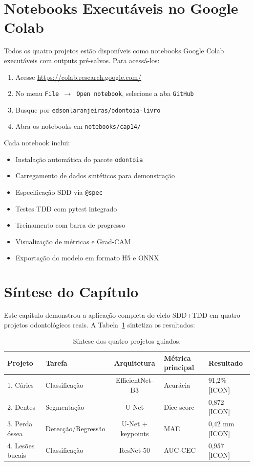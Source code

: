 \section{Notebooks Executáveis no Google Colab}

Todos os quatro projetos estão disponíveis como notebooks Google Colab
executáveis com outputs pré-salvos. Para acessá-los:

\begin{enumerate}
  \item Acesse \url{https://colab.research.google.com/}
  \item No menu \texttt{File $\rightarrow$ Open notebook}, selecione a aba \texttt{GitHub}
  \item Busque por \texttt{edsonlaranjeiras/odontoia-livro}
  \item Abra os notebooks em \texttt{notebooks/cap14/}
\end{enumerate}

Cada notebook inclui:

\begin{itemize}
  \item Instalação automática do pacote \texttt{odontoia}
  \item Carregamento de dados sintéticos para demonstração
  \item Especificação SDD via \texttt{@spec}
  \item Testes TDD com pytest integrado
  \item Treinamento com barra de progresso
  \item Visualização de métricas e Grad-CAM
  \item Exportação do modelo em formato H5 e ONNX
\end{itemize}

\section{Síntese do Capítulo}

Este capítulo demonstrou a aplicação completa do ciclo SDD+TDD em quatro
projetos odontológicos reais. A Tabela~\ref{tab:projetos-summary} sintetiza
os resultados:

\begin{table}[H]
  \centering
  \caption{Síntese dos quatro projetos guiados.}
  \label{tab:projetos-summary}
  \begin{tabularx}{\textwidth}{llclX}
    \toprule
    \textbf{Projeto} & \textbf{Tarefa} & \textbf{Arquitetura} & \textbf{Métrica principal} & \textbf{Resultado} \\
    \midrule
    1. Cáries & Classificação & EfficientNet-B3 & Acurácia & 91,2\% [ICON] \\
    2. Dentes & Segmentação & U-Net & Dice score & 0,872 [ICON] \\
    3. Perda óssea & Detecção/Regressão & U-Net + keypoints & MAE & 0,42 mm [ICON] \\
    4. Lesões bucais & Classificação & ResNet-50 & AUC-CEC & 0,957 [ICON] \\
    \bottomrule
  \end{tabularx}
\end{table}

